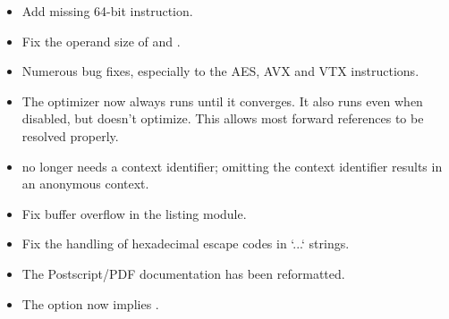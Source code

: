 \begin{itemize}
{        , apparently different versions of the VIA spec wrote them
        differently.}
    \item{Add missing 64-bit  instruction.}
    \item{Fix the operand size of  and .}
    \item{Numerous bug fixes, especially to the AES, AVX and VTX instructions.}
    \item{The optimizer now always runs until it converges. It also runs even
        when disabled, but doesn't optimize. This allows most forward references
        to be resolved properly.}
    \item{ no longer needs a context identifier; omitting the context
        identifier results in an anonymous context.}
\end{itemize}


\begin{itemize}
    \item{Fix buffer overflow in the listing module.}
    \item{Fix the handling of hexadecimal escape codes in `...` strings.}
    \item{The Postscript/PDF documentation has been reformatted.}
    \item{The  option now implies .}
\end{itemize}


